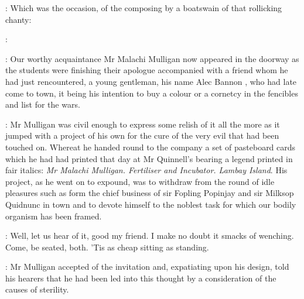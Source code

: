 \lynch:
Which was the occasion,
of the composing by a boatswain of that
rollicking chanty:

\lynch:
%




:
Our worthy acquaintance Mr Malachi Mulligan  now appeared
in the doorway as the students were finishing their apologue accompanied
with a friend whom he had just rencountered,
a young gentleman,
his name
Alec Bannon ,
who had late come to town,
it being his
intention to buy a colour or a cornetcy in the fencibles and list for the
wars.

:
Mr Mulligan was civil enough to express some relish of it all the
more as it jumped with a project of his own for the cure of the very evil
that had been touched on.
Whereat he handed round to the company a set of
pasteboard cards which he had had printed that day at Mr Quinnell's
bearing a legend printed in fair italics:
\emph{Mr Malachi Mulligan.
Fertiliser and Incubator.
Lambay Island}.
His project,
as he went on to expound,
was to withdraw from the round of
idle pleasures such as form the chief business of sir Fopling Popinjay and
sir Milksop Quidnunc in town and to devote himself to the noblest task for
which our bodily organism has been framed.

\dixon:
Well,
let us hear of it,
good my friend.
I make no doubt it
smacks of wenching.
Come,
be seated,
both.
'Tis as cheap sitting as
standing.

:
Mr Mulligan accepted of the invitation and,
expatiating upon his
design,
told his hearers that he had been led into this thought by a
consideration of the causes of sterility.

